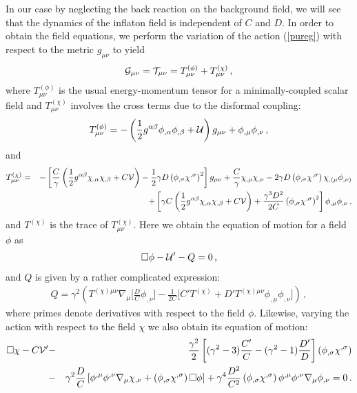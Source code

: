 \documentclass[aps,prd,amsmath,amssymb,preprintnumbers,onecolumn,11pt,nofootinbib]{revtex4}
\begin{document}
In our case by neglecting the back reaction on the background field, we will see that the dynamics of the inflaton field is independent of $C$ and $D$. In order to obtain the field equations, we perform the variation of the action (\ref{pureg}) with respect to the metric $g_{\mu\nu}$ to yield
\begin{eqnarray} \label{fieldeq}
{\cal G}_{\mu\nu} = {\cal T}_{\mu\nu} = T^{(\phi)}_{\mu\nu} + T^{(\chi)}_{\mu\nu}\,,
\end{eqnarray}
where $T^{(\phi)}_{\mu\nu} $ is the usual energy-momentum tensor for a minimally-coupled scalar field and $T^{(\chi)}_{\mu\nu}$ involves the cross terms due to the disformal coupling:
\begin{eqnarray} \label{Tphimunu}
T^{(\phi)}_{\mu\nu} = -\left(\frac{1}{2}g^{\alpha\beta}\phi_{,\alpha}\phi_{,\beta} + {\cal U}\right)g_{\mu\nu} + \phi_{,\mu}\phi_{,\nu}\,,
\end{eqnarray}
and 
\begin{eqnarray} \label{Tmunu}
T^{(\chi)}_{\mu\nu} &=& -\left[\frac{C}{\gamma}\left(\frac{1}{2}g^{\alpha\beta}\chi_{,\alpha}\chi_{,\beta} + C{\cal V}\right) - \frac{1}{2}\gamma D\left(\phi_{,\sigma}\chi^{,\sigma}\right)^{2}\right]g_{\mu\nu} + \frac{C}{\gamma}\chi_{,\mu}\chi_{,\nu} - 2\gamma D\left(\phi_{,\sigma}\chi^{,\sigma}\right)\chi_{,(\mu}\phi_{,\nu)}\nonumber\\&&+ \left[\gamma C \left(\frac{1}{2}g^{\alpha\beta}\chi_{,\alpha}\chi_{,\beta} + C{\cal V}\right) + \frac{\gamma^{3}D^{2}}{2C}\left(\phi_{,\sigma}\chi^{,\sigma}\right)^{2}\right]\phi_{,\mu}\phi_{,\nu}\,,
\end{eqnarray}
and $T^{(\chi)}$ is the trace of $T^{(\chi)}_{\mu\nu}$. Here we obtain the equation of motion for a field $\phi$ as
\begin{eqnarray} \label{ephig}
\Box\phi -{\cal U}' -Q = 0\,,
\end{eqnarray}
and $Q$ is given by a rather complicated expression:
\begin{eqnarray} \label{qg}
Q = \gamma^{2}\left(T^{(\chi)\mu\nu}\nabla_{\mu}\Big[\frac{D}{C}\phi_{,\nu}\Big] - \frac{1}{2C}\Big[C'T^{(\chi)} + D'T^{(\chi)\mu\nu}\phi_{,\mu}\phi_{,\nu}\Big]\right)\,,
\end{eqnarray}
where primes denote derivatives with respect to the field $\phi$. Likewise, varying the action with respect to the field $\chi$ we also obtain its equation of motion:
\begin{eqnarray} \label{echig}
\Box\chi -C{\cal V}' &-& \frac{\gamma^{2}}{2}\left[(\gamma^{2} - 3)\frac{C'}{C} - (\gamma^{2} - 1)\frac{D'}{D} \right]\left(\phi_{,\sigma}\chi^{,\sigma}\right)\nonumber\\&-& \gamma^{2}\frac{D}{C}\left[\phi^{,\mu}\phi^{,\nu}\nabla_{\mu}\chi_{,\nu} + \left(\phi_{,\sigma}\chi^{,\sigma}\right)\Box\phi\right] + \gamma^{4}\frac{D^{2}}{C^{2}} \left(\phi_{,\sigma}\chi^{,\sigma}\right)\phi^{,\mu}\phi^{,\nu}\nabla_{\mu}\phi_{,\nu} = 0\,.
\end{eqnarray}
\end{document}
